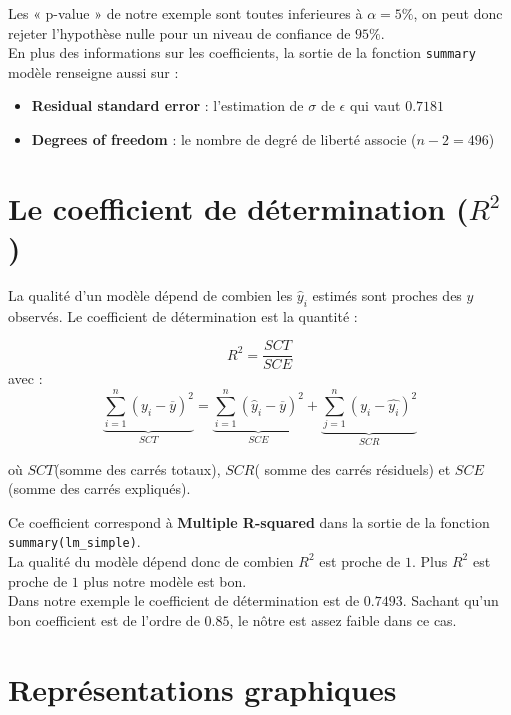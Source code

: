 \documentclass[
]{book}
\providecommand{\tightlist}{%
  \setlength{\itemsep}{0pt}\setlength{\parskip}{0pt}}
\begin{document}
Les « p-value » de notre exemple sont toutes inferieures à
\(\alpha = 5\%\), on peut donc rejeter l'hypothèse nulle pour un niveau de
confiance de \(95\%\).\\
En plus des informations sur les coefficients, la sortie de la fonction
\texttt{summary} modèle renseigne aussi sur :

\begin{itemize}
\tightlist
\item
  \textbf{Residual standard error} : l'estimation de \(\sigma\) de \(\epsilon\)
  qui vaut \(0.7181\)
\item
  \textbf{Degrees of freedom} : le nombre de degré de liberté associe
  (\(n-2 = 496\))
\end{itemize}

\hypertarget{le-coefficient-de-duxe9termination-r2}{%
\section{\texorpdfstring{Le coefficient de détermination (\(R^2\))}{Le coefficient de détermination (R\^{}2)}}\label{le-coefficient-de-duxe9termination-r2}}

La qualité d'un modèle dépend de combien les \(\hat{y}_i\) estimés sont
proches des \(y\) observés. Le coefficient de détermination est la
quantité :

\[R^2 = \frac{SCT}{SCE}\]
avec :\\
\[
\underbrace{\sum\limits_{i=1}^{n}(y_{i}-\overline{y})^2}_{SCT}=\underbrace{\sum\limits_{i=1}^{n}(\hat{y}_{i}-\overline{y})^2}_{SCE}+\underbrace{\sum\limits_{j=1}^n (y_i-\hat{y_i})^2}_{SCR}
\]

où \(SCT\)(somme des carrés totaux), \(SCR\)( somme des carrés résiduels) et
\(SCE\)(somme des carrés expliqués).

Ce coefficient correspond à
\textbf{Multiple R-squared} dans la sortie de la fonction
\texttt{summary(lm\_simple)}.\\
La qualité du modèle dépend donc de combien \(R^2\) est proche de \(1\).
Plus \(R^2\) est proche de \(1\) plus notre modèle est bon.\\
Dans notre exemple le coefficient de détermination est de \(0.7493\).
Sachant qu'un bon coefficient est de l'ordre de \(0.85\), le nôtre est
assez faible dans ce cas.

\hypertarget{repruxe9sentations-graphiques}{%
\section{Représentations graphiques}\label{repruxe9sentations-graphiques}}
\end{document}
